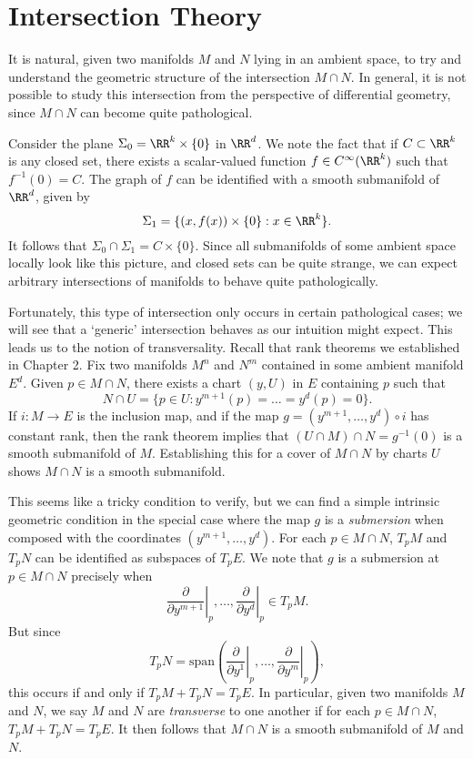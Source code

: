\chapter{Intersection Theory}

It is natural, given two manifolds $M$ and $N$ lying in an ambient space, to try and understand the geometric structure of the intersection $M \cap N$. In general, it is not possible to study this intersection from the perspective of differential geometry, since $M \cap N$ can become quite pathological.

\begin{example}
    Consider the plane $\Sigma_0 = \RR^k \times \{ 0 \}$ in $\RR^d$. We note the fact that if $C \subset \RR^k$ is any closed set, there exists a scalar-valued function $f \in C^\infty(\RR^k)$ such that $f^{-1}(0) = C$. The graph of $f$ can be identified with a smooth submanifold of $\RR^d$, given by
    \[ \Sigma_1 = \{ (x,f(x)) \times \{ 0 \} : x \in \RR^k \}. \]
    It follows that $\Sigma_0 \cap \Sigma_1 = C \times \{ 0 \}$. Since all submanifolds of some ambient space locally look like this picture, and closed sets can be quite strange, we can expect arbitrary intersections of manifolds to behave quite pathologically.
\end{example}

Fortunately, this type of intersection only occurs in certain pathological cases; we will see that a `generic' intersection behaves as our intuition might expect. This leads us to the notion of transversality. Recall that rank theorems we established in Chapter 2. Fix two manifolds $M^n$ and $N^m$ contained in some ambient manifold $E^d$. Given $p \in M \cap N$, there exists a chart $(y,U)$ in $E$ containing $p$ such that
%
\[ N \cap U = \{ p \in U : y^{m+1}(p) = \dots = y^d(p) = 0 \}. \]
%
If $i: M \to E$ is the inclusion map, and if the map $g = (y^{m+1}, \dots, y^d) \circ i$ has constant rank, then the rank theorem implies that $(U \cap M) \cap N = g^{-1}(0)$ is a smooth submanifold of $M$. Establishing this for a cover of $M \cap N$ by charts $U$ shows $M \cap N$ is a smooth submanifold.

This seems like a tricky condition to verify, but we can find a simple intrinsic geometric condition in the special case where the map $g$ is a \emph{submersion} when composed with the coordinates $(y^{m+1}, \dots, y^d)$. For each $p \in M \cap N$, $T_p M$ and $T_p N$ can be identified as subspaces of $T_p E$. We note that $g$ is a submersion at $p \in M \cap N$ precisely when
%
\[ \left. \frac{\partial}{\partial y^{m+1}} \right|_p, \dots, \left. \frac{\partial}{\partial y^d} \right|_p \in T_p M. \]
%
But since
%
\[ T_p N = \text{span} \left( \left. \frac{\partial}{\partial y^1} \right|_p, \dots, \left. \frac{\partial}{\partial y^m} \right|_p \right), \]
%
this occurs if and only if $T_p M + T_p N = T_p E$. In particular, given two manifolds $M$ and $N$, we say $M$ and $N$ are \emph{transverse} to one another if for each $p \in M \cap N$, $T_p M + T_p N = T_p E$. It then follows that $M \cap N$ is a smooth submanifold of $M$ and $N$.

